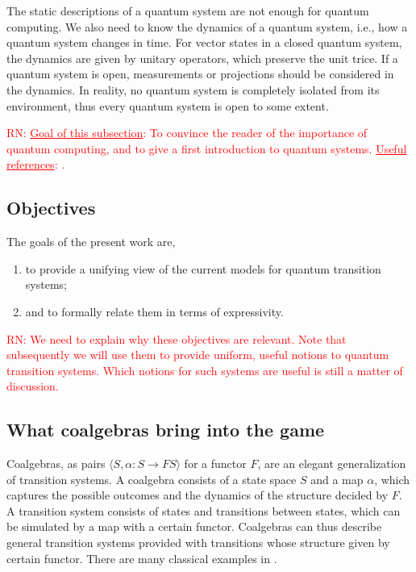 \documentclass[a4paper, 11pt]{article}
\newcommand{\nevComment}[1]{\textcolor{red}{RN: #1}}
\begin{document}
The static descriptions of a quantum system are not enough for quantum computing. We also need to know the dynamics of a quantum system, i.e., how a quantum system changes in time. For vector states in a closed quantum system, the dynamics are given by unitary operators, which preserve the unit trice. If a quantum system is open, measurements or projections should be considered in the dynamics. In reality, no quantum system is completely isolated from its environment, thus every quantum system is open to some extent. 


\nevComment{\underline{Goal of this subsection}: To convince the
  reader of the importance of quantum computing, and to give a first
  introduction to quantum systems.  \underline{Useful references}:
  \cite{nielsen2002quantum,NM08,ying16}. }


\subsection{Objectives}

The goals of the present work are,
\begin{enumerate}
\item to provide a unifying view of the
  current models for quantum transition systems;
\item and to formally relate them in terms of expressivity.
\end{enumerate}
\nevComment{We need to explain why these objectives are relevant.
  Note that subsequently we will use them to provide uniform, useful
  notions to quantum transition systems. Which notions for
  such systems are useful is still a matter of
  discussion.}

\subsection{What coalgebras bring into the game}

Coalgebras, as pairs $\langle S,\alpha:S\rightarrow FS\rangle$ for a functor $F$, are an elegant generalization of transition systems. A coalgebra consists of a state space $S$ and a map $\alpha$, which captures the possible outcomes and the dynamics of the structure decided by $F$. A transition system consists of states and transitions between states, which can be  simulated by a map with a certain functor. Coalgebras can thus describe general transition systems provided with transitions whose structure given by certain functor. There are many classical examples in \cite{rutten2000}. 
\end{document}
